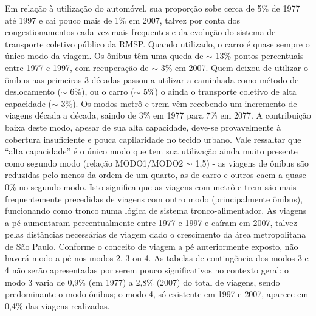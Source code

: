 Em relação à utilização do automóvel, sua proporção sobe cerca de 5\% de 1977 até 1997 e cai pouco mais de 1\% em 2007, talvez por conta dos congestionamentos cada vez mais frequentes e da evolução do sistema de transporte coletivo público da RMSP. Quando utilizado, o carro é quase sempre o único modo da viagem.
Os ônibus têm uma queda de $\sim$ 13\% pontos percentuais entre 1977 e 1997, com recuperação de $\sim$ 3\% em 2007. Quem deixou de utilizar o ônibus nas primeiras 3 décadas passou a utilizar a caminhada como método de deslocamento ($\sim$ 6\%), ou o carro ($\sim$ 5\%) o ainda o transporte coletivo de alta capacidade ($\sim$ 3\%).
Os modos metrô e trem vêm recebendo um incremento de viagens década a década, saindo de 3\% em 1977 para 7\% em 2077. A contribuição baixa deste modo, apesar de sua alta capacidade, deve-se provavelmente à cobertura insuficiente e pouca capilaridade no tecido urbano.
Vale ressaltar que ``alta capacidade'' é o único modo que tem sua utilização ainda muito presente como segundo modo (relação MODO1/MODO2 $\sim$ 1,5) - as viagens de ônibus são reduzidas pelo menos da ordem de um quarto, as de carro e outros caem a quase 0\% no segundo modo.
Isto significa que as viagens com metrô e trem são mais frequentemente precedidas de viagens com outro modo (principalmente ônibus), funcionando como tronco numa lógica de sistema tronco-alimentador.
As viagens a pé aumentaram percentualmente entre 1977 e 1997 e caíram em 2007, talvez pelas distâncias necessárias de viagem dado o crescimento da área metropolitana de São Paulo. Conforme o conceito de viagem a pé anteriormente exposto, não haverá modo a pé nos modos 2, 3 ou 4.
As tabelas de contingência dos modos 3 e 4 não serão apresentadas por serem pouco significativos no contexto geral: o modo 3 varia de 0,9\% (em 1977) a 2,8\% (2007) do total de viagens, sendo predominante o modo ônibus; o modo 4, só existente em 1997 e 2007, aparece em 0,4\% das viagens realizadas.

